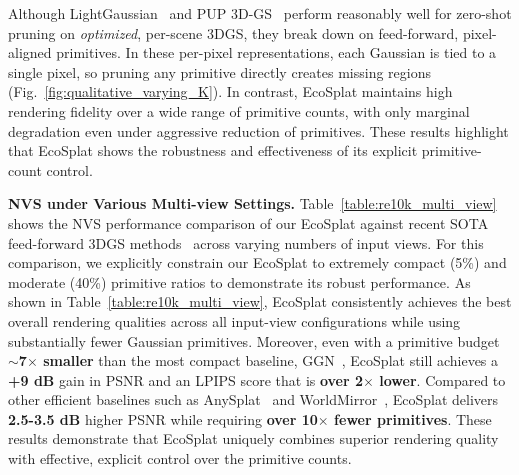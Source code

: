 Although LightGaussian~\cite{fan2023lightgaussian} and PUP 3D-GS~\cite{HansonTuPUP3DGS} perform reasonably well for zero-shot pruning on \textit{optimized}, per-scene 3DGS, they break down on feed-forward, pixel-aligned primitives. In these per-pixel representations, each Gaussian is tied to a single pixel, so pruning any primitive directly creates missing regions (Fig.~\ref{fig:qualitative_varying_K}).
In contrast, EcoSplat maintains high rendering fidelity over a wide range of primitive counts, with only marginal degradation even under aggressive reduction of primitives. These results highlight that EcoSplat shows the robustness and effectiveness of its explicit primitive-count control.

\noindent \textbf{NVS under Various Multi-view Settings.}
Table~\ref{table:re10k_multi_view} shows the NVS performance comparison of our EcoSplat against recent SOTA feed-forward 3DGS methods~\cite{xu2025depthsplat, ye2024no, huang2025no, zhang2024gaussian, ziwen2025long, jiang2025anysplat} across varying numbers of input views. For this comparison, we explicitly constrain our EcoSplat to extremely compact (5\%) and moderate (40\%) primitive ratios to demonstrate its robust performance.
As shown in Table~\ref{table:re10k_multi_view}, EcoSplat consistently achieves the best overall rendering qualities across all input-view configurations while using substantially fewer Gaussian primitives. Moreover, even with a primitive budget \textbf{$\sim$7$\times$ smaller} than the most compact baseline, GGN~\cite{zhang2024gaussian}, EcoSplat still achieves a \textbf{+9 dB} gain in PSNR and an LPIPS score that is \textbf{over 2$\times$ lower}. Compared to other efficient baselines such as AnySplat~\cite{jiang2025anysplat} and WorldMirror~\cite{liu2025worldmirror}, EcoSplat delivers \textbf{2.5-3.5 dB} higher PSNR while requiring \textbf{over 10$\times$ fewer primitives}. These results demonstrate that EcoSplat uniquely combines superior rendering quality with effective, explicit control over the primitive counts.

